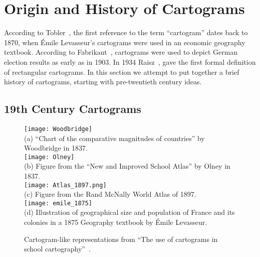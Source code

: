 \documentclass{egpubl}
\begin{document}
\section{Origin and History of Cartograms}
\label{sec:early}

According to Tobler~\cite{Tobler04}, the first reference to the term ``cartogram'' dates back to 1870, when \'Emile Levasseur's cartograms were used in an economic geography textbook. 
According to Fabrikant~\cite{Fabrikant_commentary}, cartograms were used to depict German election results as early as in 1903. 
In 1934 Raisz~\cite{Raisz34}, gave the first formal definition of rectangular cartograms. 
In this section we attempt to put together a brief history of cartograms, starting with pre-twentieth century ideas.


\subsection{19th Century Cartograms}


\begin{figure}[htbp]
\centering
\texttt{[image: Woodbridge]}\\

(a) ``Chart of the comparative magnitudes of countries'' by Woodbridge in 1837.\\\vspace{.25cm}
\texttt{[image: Olney]}\\
(b) Figure from the ``New and Improved School Atlas'' by Olney in 1837.\\\vspace{.25cm}
\texttt{[image: Atlas\_1897.png]}\\
(c) Figure from the Rand McNally World Atlas of 1897.\\\vspace{.25cm}
\texttt{[image: emile\_1875]}\\
(d) Illustration of geographical size and population of France and its colonies in a 1875 Geography textbook by \'Emile Levasseur.
 \caption{Cartogram-like representations from ``The use of cartograms in school cartography''~\cite{school_cartography}.
\label{fig:cartograms}}
\end{figure}
\end{document}
